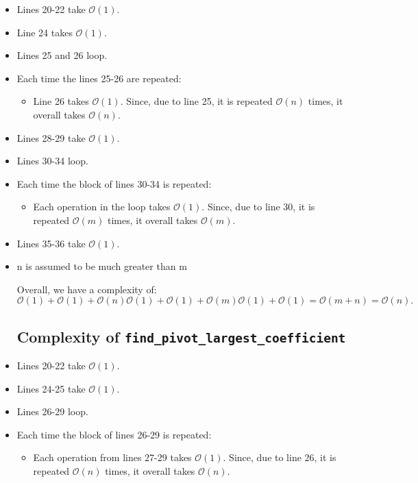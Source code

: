 \documentclass[a4paper]{article}
\numberwithin{equation}{section}
\begin{document}
\begin{itemize}
  \item   Lines 20-22 take $\mathcal{O}(1)$.
  \item Line 24 takes $\mathcal{O}(1)$.
  \item Lines 25 and 26 loop.
  \item Each time the lines 25-26 are repeated:
  \begin{itemize}

    \item Line 26 takes $\mathcal{O}(1)$. Since, due to line 25, it is repeated $\mathcal{O}(n)$ times, it overall takes $\mathcal{O}(n)$.
  \end{itemize}
\end{itemize}
\begin{itemize}
  \item Lines 28-29 take $\mathcal{O}(1)$.
  \item Lines 30-34 loop.
  \item Each time the block of lines 30-34 is repeated:
  \begin{itemize}

    \item  Each operation in the loop takes $\mathcal{O}(1)$. Since, due to line 30, it is repeated $\mathcal{O}(m)$ times, it overall takes $\mathcal{O}(m)$.
  \end{itemize}
  \item Lines 35-36 take $\mathcal{O}(1)$.
  \item n is assumed to be much greater than m

Overall, we have a complexity of:
\begin{equation}
    \label{eq:complexity_ls}
  \mathcal{O}(1) + \mathcal{O}(1) + \mathcal{O}(n) \mathcal{O}(1) + \mathcal{O}(1) + \mathcal{O}(m) \mathcal{O}(1) + \mathcal{O}(1) = \mathcal{O}(m + n) =  \mathcal{O}(n).
\end{equation}
\subsection{Complexity of  \texttt{find\_pivot\_largest\_coefficient}}
\label{sec:complexity_lc}
  
  \item   Lines 20-22 take $\mathcal{O}(1)$.
  \item Lines 24-25 take $\mathcal{O}(1)$.
  \item Lines 26-29 loop.
  \item Each time the block of lines 26-29 is repeated:
  \begin{itemize}

    \item  Each operation from lines 27-29 takes $\mathcal{O}(1)$. Since, due to line 26, it is repeated $\mathcal{O}(n)$ times, it overall takes $\mathcal{O}(n)$.
  \end{itemize}
\end{itemize}
\end{document}
